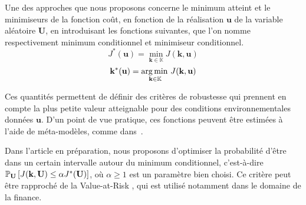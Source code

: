 \documentclass[../../Main_ManuscritThese.tex]{subfiles}
\begin{document}
Une des approches que nous proposons concerne le minimum atteint et le minimiseurs de la fonction coût, en fonction de la réalisation $\mathbf{u}$ de la variable aléatoire $\mathbf{U}$, en introduisant les fonctions suivantes, que l'on nomme respectivement minimum conditionnel et minimiseur conditionnel.
\begin{equation}
  \label{eq:Jstar}
  J^*(\mathbf{u}) = \min_{\mathbf{k}\in\mathbb{K}} J(\mathbf{k},\mathbf{u})
\end{equation}
\begin{equation}
  \label{eq:Kstar}
  \mathbf{k}^*(\mathbf{u}) = \operatorname*{arg\,min \,}_{\mathbf{k}\in \mathbb{K}}J(\mathbf{k},\mathbf{u})
\end{equation}

Ces quantités permettent de définir des critères de robustesse qui prennent en compte la plus petite valeur atteignable pour des conditions environnementales données $\mathbf{u}$.
D'un point de vue pratique, ces fonctions peuvent être estimées à l'aide de méta-modèles, comme dans~\cite{ginsbourger_bayesian_2014}.
 
Dans l'article en préparation, nous proposons d'optimiser la probabilité d'être dans un certain intervalle autour du minimum conditionnel, c'est-à-dire $\mathbb{P}_{\mathbf{U}}\left[J(\mathbf{k},\mathbf{U}) \leq \alpha J^*(\mathbf{U}) \right]$, où $\alpha \geq 1$ est un paramètre bien choisi. Ce critère peut être rapproché de la Value-at-Risk \cite{rockafellar_deviation_2002}, qui est utilisé notamment dans le domaine de la finance.
\end{document}
